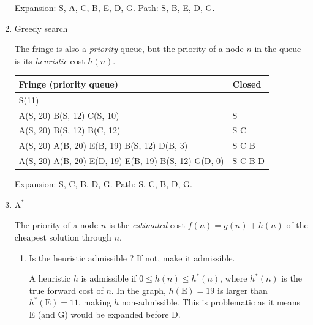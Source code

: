 \documentclass[11pt, a4paper]{article}
\def\Astar{$\text{A}^*$}
\begin{document}
\begin{enumerate}
\begin{solution}
        Expansion: S, A, C, B, E, D, G. Path: S, B, E, D, G.
    \end{solution}

    \item Greedy search

    \begin{solution}
        The fringe is also a \emph{priority} queue, but the priority of a node $n$ in the queue is its \emph{heuristic} cost $h(n)$.

        \begin{table}[h]
            \centering
            \begin{tabular}{l|l}
                \toprule
                Fringe (priority queue) & Closed \\
                \midrule
                S(11) & \\
                A(S, 20) B(S, 12) C(S, 10) & S \\
                A(S, 20) B(S, 12) B(C, 12) & S C \\
                A(S, 20) A(B, 20) E(B, 19) B(S, 12) D(B, 3) & S C B \\
                A(S, 20) A(B, 20) E(D, 19) E(B, 19) B(S, 12) G(D, 0) & S C B D \\
                \bottomrule
            \end{tabular}
        \end{table}

        Expansion: S, C, B, D, G. Path: S, C, B, D, G.
    \end{solution}

    \item \Astar{}

    \begin{solution}
    The priority of a node $n$ is the \emph{estimated} cost $f(n) = g(n) + h(n)$ of the cheapest solution through $n$.
    \end{solution}

    \begin{enumerate}
        \item Is the heuristic admissible ? If not, make it admissible.

        \begin{solution}
            A heuristic $h$ is admissible if $0 \leq h(n) \leq h^*(n)$, where $h^*(n)$ is the true forward cost of $n$. In the graph, $h(\text{E}) = 19$ is larger than $h^*(\text{E}) = 11$, making $h$ non-admissible. This is problematic as it means E (and G) would be expanded before D.


\end{solution}
\end{enumerate}
\end{enumerate}
\end{document}
